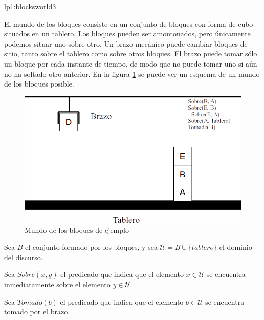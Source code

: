 \begin{defproblem}{lp1:blocksworld3}%
	\begin{onlyproblem}%
		El mundo de los bloques consiste en un conjunto de bloques con forma de cubo situados en un tablero. Los bloques pueden ser amontonados, pero únicamente podemos situar uno sobre otro. Un brazo mecánico puede cambiar bloques de sitio, tanto sobre el tablero como sobre otros bloques. El brazo puede tomar sólo un bloque por cada instante de tiempo, de modo que no puede tomar uno si aún no ha soltado otro anterior. En la figura \ref{fig:ejemplo-bloques3} se puede ver un esquema de un mundo de los bloques posible.
		
		\begin{figure}[b]
			\centering
			\includegraphics[width=0.7\linewidth]{Blocksworld-ejemplo}
			\caption[Mundo de los bloques de ejemplo]{Mundo de los bloques de ejemplo}
			\label{fig:ejemplo-bloques3}
		\end{figure}
		
		
		Sea $ B $ el conjunto formado por los bloques, y sea $ \mathcal{U} = B \cup \{tablero\} $ el dominio del discurso.
		
		Sea $ Sobre(x, y) $ el predicado que indica que el elemento $ x \in \mathcal{U} $ se encuentra inmediatamente sobre el elemento $ y \in \mathcal{U} $.
		
		Sea $ Tomado(b) $ el predicado que indica que el elemento $ b \in \mathcal{U} $ se encuentra tomado por el brazo.
		

\end{onlyproblem}
\end{defproblem}
